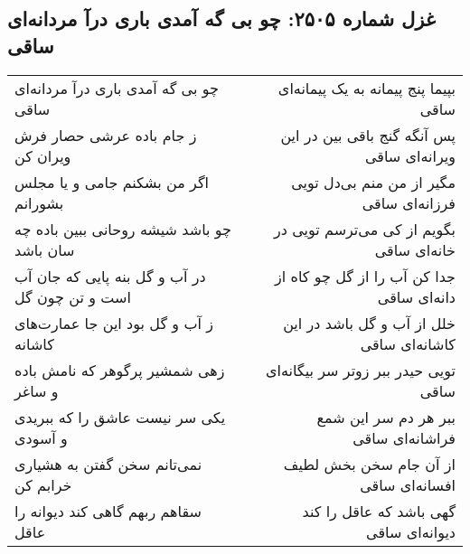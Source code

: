 \begin{center}
\section*{غزل شماره ۲۵۰۵: چو بی گه آمدی باری درآ مردانه‌ای ساقی}
\label{sec:2505}
\begin{longtable}{l p{0.5cm} r}
چو بی گه آمدی باری درآ مردانه‌ای ساقی
&&
بپیما پنج پیمانه به یک پیمانه‌ای ساقی
\\
ز جام باده عرشی حصار فرش ویران کن
&&
پس آنگه گنج باقی بین در این ویرانه‌ای ساقی
\\
اگر من بشکنم جامی و یا مجلس بشورانم
&&
مگیر از من منم بی‌دل تویی فرزانه‌ای ساقی
\\
چو باشد شیشه روحانی ببین باده چه سان باشد
&&
بگویم از کی می‌ترسم تویی در خانه‌ای ساقی
\\
در آب و گل بنه پایی که جان آب است و تن چون گل
&&
جدا کن آب را از گل چو کاه از دانه‌ای ساقی
\\
ز آب و گل بود این جا عمارت‌های کاشانه
&&
خلل از آب و گل باشد در این کاشانه‌ای ساقی
\\
زهی شمشیر پرگوهر که نامش باده و ساغر
&&
تویی حیدر ببر زوتر سر بیگانه‌ای ساقی
\\
یکی سر نیست عاشق را که ببریدی و آسودی
&&
ببر هر دم سر این شمع فراشانه‌ای ساقی
\\
نمی‌تانم سخن گفتن به هشیاری خرابم کن
&&
از آن جام سخن بخش لطیف افسانه‌ای ساقی
\\
سقاهم ربهم گاهی کند دیوانه را عاقل
&&
گهی باشد که عاقل را کند دیوانه‌ای ساقی
\\
\end{longtable}
\end{center}
